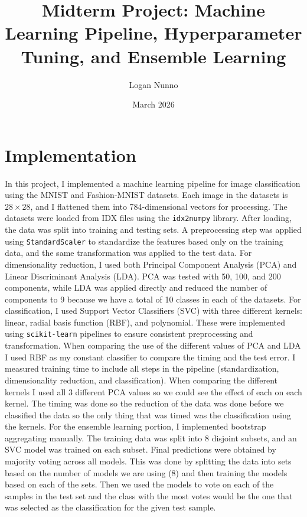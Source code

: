 \documentclass{article}
\title{Midterm Project: Machine Learning Pipeline, Hyperparameter Tuning, and Ensemble Learning}
\author{Logan Nunno }
\date{March 2026}
\begin{document}
\maketitle
\section{Implementation} 
In this project, I implemented a machine learning pipeline for image classification using the MNIST and Fashion-MNIST datasets. Each image in the datasets is $28 \times 28$, and I flattened them into 784-dimensional vectors for processing. The datasets were loaded from IDX files using the \texttt{idx2numpy} library. After loading, the data was split into training and testing sets. A preprocessing step was applied using \texttt{StandardScaler} to standardize the features based only on the training data, and the same transformation was applied to the test data. For dimensionality reduction, I used both Principal Component Analysis (PCA) and Linear Discriminant Analysis (LDA). PCA was tested with 50, 100, and 200 components, while LDA was applied directly and reduced the number of components to 9 because we have a total of 10 classes in each of the datasets. For classification, I used Support Vector Classifiers (SVC) with three different kernels: linear, radial basis function (RBF), and polynomial. These were implemented using \texttt{scikit-learn} pipelines to ensure consistent preprocessing and transformation. When comparing the use of the different values of PCA and LDA I used RBF as my constant classifier to compare the timing and the test error. I measured training time to include all steps in the pipeline (standardization, dimensionality reduction, and classification). When comparing the different kernels I used all 3 different PCA values so we could see the effect of each on each kernel. The timing was done so the reduction of the data was done before we classified the data so the only thing that was timed was the classification using the kernels. For the ensemble learning portion, I implemented bootstrap aggregating manually. The training data was split into 8 disjoint subsets, and an SVC model was trained on each subset. Final predictions were obtained by majority voting across all models. This was done by splitting the data into sets based on the number of models we are using (8) and then training the models based on each of the sets. Then we used the models to vote on each of the samples in the test set and the class with the most votes would be the one that was selected as the classification  for the given test sample. 
\end{document}
